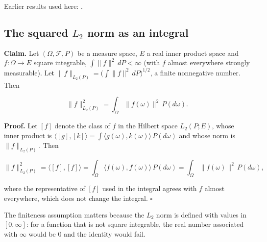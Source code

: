 \documentclass[11pt,a4paper]{report}
\begin{document}
Earlier results used here: \cite[Section~3.21]{LangevinLean2026ULASC}.
\subsection{\texorpdfstring{The squared \(L_2\) norm as an integral}{The squared L₂ norm as an integral}}
\label{report-step-AverageLMC-CenteredPerturbation-lean-1}


\textbf{Claim.} Let \((\Omega,\mathcal F,P)\) be a measure space, \(E\) a real inner product space and \(f:\Omega\to E\) square integrable, \(\int\|f\|^2\,dP<\infty\) (with \(f\) almost everywhere strongly measurable). Let \(\|f\|_{L_2(P)}=\bigl(\int\|f\|^2\,dP\bigr)^{1/2}\), a finite nonnegative number. Then


\[\|f\|_{L_2(P)}^2=\int_\Omega\|f(\omega)\|^2\,P(d\omega).\]


\textbf{Proof.} Let \([f]\) denote the class of \(f\) in the Hilbert space \(L_2(P;E)\), whose inner product is \(\langle[g],[k]\rangle=\int\langle g(\omega),k(\omega)\rangle\,P(d\omega)\) and whose norm is \(\|f\|_{L_2(P)}\). Then


\[\|f\|_{L_2(P)}^2=\langle[f],[f]\rangle=\int_\Omega\langle f(\omega),f(\omega)\rangle\,P(d\omega)=\int_\Omega\|f(\omega)\|^2\,P(d\omega),\]


where the representative of \([f]\) used in the integral agrees with \(f\) almost everywhere, which does not change the integral. \(\square\)




The finiteness assumption matters because the \(L_2\) norm is defined with values in \([0,\infty]\): for a function that is not square integrable, the real number associated with \(\infty\) would be \(0\) and the identity would fail.
\end{document}
